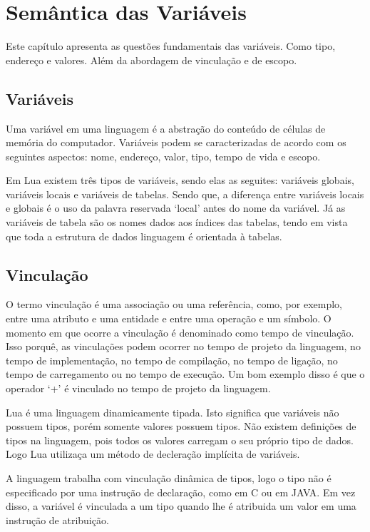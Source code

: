 \documentclass[
	12pt,				%
	openright,			%
	twoside,			%
	a4paper,			%
	english,			%
	brazil,				%
	]{abntex2}
\begin{document}
\chapter{Semântica das Variáveis}
Este capítulo apresenta as questões fundamentais das variáveis. Como tipo, endereço e valores. Além da abordagem de vinculação e de escopo.

\section{Variáveis}
Uma variável em uma linguagem é a abstração do conteúdo de células de memória do computador. Variáveis podem se caracterizadas de acordo com os seguintes aspectos: nome, endereço, valor, tipo, tempo de vida e escopo.

Em Lua existem três tipos de variáveis, sendo elas as seguites: variáveis globais, variáveis locais e variáveis de tabelas. Sendo que, a diferença entre variáveis locais e globais é o uso da palavra reservada `local' antes do nome da variável. Já as variáveis de tabela são os nomes dados aos índices das tabelas, tendo em vista que toda a estrutura de dados linguagem é orientada à tabelas.

\section{Vinculação}
O termo vinculação é uma associação ou uma referência, como, por exemplo, entre uma atributo e uma entidade e entre uma operação e um símbolo. O momento em que ocorre a vinculação é denominado como tempo de vinculação. Isso porquê, as vinculações podem ocorrer no tempo de projeto da linguagem, no tempo de implementação, no tempo de compilação, no tempo de ligação, no tempo de carregamento ou no tempo de execução. Um bom exemplo disso é que o operador `+' é vinculado no tempo de projeto da linguagem.

Lua é uma linguagem dinamicamente tipada. Isto significa que variáveis não possuem tipos, porém somente valores possuem tipos. Não existem definições de tipos na linguagem, pois todos os valores carregam o seu próprio tipo de dados. Logo Lua utilizaça um método de decleração implícita de variáveis.

A linguagem trabalha com vinculação dinâmica de tipos, logo o tipo não é especificado por uma instrução de declaração, como em C ou em JAVA. Em vez disso, a variável é vinculada a um tipo quando lhe é atribuida um valor em uma instrução de atribuição.
\end{document}
